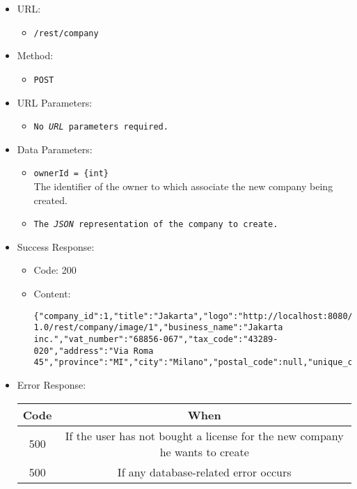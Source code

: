 \begin{itemize}
    
    \item URL: 
    \begin{itemize}
        \item \texttt{/rest/company}
    \end{itemize}
    
    \item Method: 
    \begin{itemize}
        \item \texttt{POST}
    \end{itemize}
    
    \item URL Parameters: 
    \begin{itemize}
        \item \texttt{No \textit{URL} parameters required.}
    \end{itemize}
    
    \item Data Parameters: 
    \begin{itemize}
        \item \texttt{ownerId = \{int\}} \\
        The identifier of the owner to which associate the new company being created.
        \item \texttt{The \textit{JSON} representation of the company to create.}     
    \end{itemize}

    \item Success Response: 
    \begin{itemize}
        \item Code: 200
        \item Content:
        \begin{lstlisting}
{"company_id":1,"title":"Jakarta","logo":"http://localhost:8080/bitsei-1.0/rest/company/image/1","business_name":"Jakarta inc.","vat_number":"68856-067","tax_code":"43289-020","address":"Via Roma 45","province":"MI","city":"Milano","postal_code":null,"unique_code":"1","has_mail_notifications":false,"has_telegram_notifications":false}           
        \end{lstlisting} 
    \end{itemize}
    
    \item Error Response:
    \begin{table}[!h]
    \centering 
    \begin{tabular}{|c|c|}
    \hline
    \multicolumn{1}{|c|}{\textbf{Code}} & \multicolumn{1}{c|}{\textbf{When}} \\ \hline
    500 & If the user has not bought a license for the new company he wants to create \\\hline
    500 & If any database-related error occurs \\\hline
    \end{tabular} 
    \end{table} 
    
\end{itemize}


